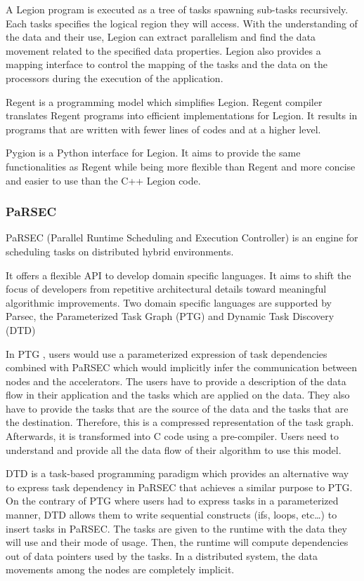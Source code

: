 A Legion program is executed as a tree of tasks spawning sub-tasks recursively.
Each tasks specifies the logical region they will access.
With the understanding of the data and their use, Legion can extract parallelism and find the data movement related to the specified data properties.
Legion also provides a mapping interface to control the mapping of the tasks and the data on the processors during the execution of the application.

Regent \cite{SLTBA2015} is a programming model which simplifies Legion.
Regent compiler translates Regent programs into efficient implementations for Legion.
It results in programs that are written with fewer lines of codes and at a higher level.

Pygion \cite{SlauA2019} is a Python interface for Legion.
It aims to provide the same functionalities as Regent while being more flexible than Regent and more concise and easier to use than the C++ Legion code.

\subsubsection{PaRSEC}
PaRSEC \cite{BBDHL2011} \cite{BBDFH2013} (Parallel Runtime Scheduling and Execution Controller) is an engine for scheduling tasks on distributed hybrid environments.

It offers a flexible API to develop domain specific languages.
It aims to shift the focus of developers from repetitive architectural details toward meaningful algorithmic improvements.
Two domain specific languages are supported by Parsec, the Parameterized Task Graph \cite{DBBHD2014} (PTG) and Dynamic Task Discovery \cite{HoHBD2017} (DTD)

In PTG \cite{DBBHD2014}, users would use a parameterized expression of task dependencies combined with PaRSEC which would implicitly infer the communication between nodes and the accelerators.
The users have to provide a description of the data flow in their application and the tasks which are applied on the data.
They also have to provide the tasks that are the source of the data and the tasks that are the destination.
Therefore, this is a compressed representation of the task graph.
Afterwards, it is transformed into C code using a pre-compiler.
Users need to understand and provide all the data flow of their algorithm to use this model.


DTD \cite{HoHBD2017} is a task-based programming paradigm which provides an alternative way to express task dependency in PaRSEC that achieves a similar purpose to PTG.
On the contrary of PTG where users had to express tasks in a parameterized manner, DTD allows them to write sequential constructs (ifs, loops, etc\dots) to insert tasks in PaRSEC.
The tasks are given to the runtime with the data they will use and their mode of usage.
Then, the runtime will compute dependencies out of data pointers used by the tasks.
In a distributed system, the data movements among the nodes are completely implicit.

